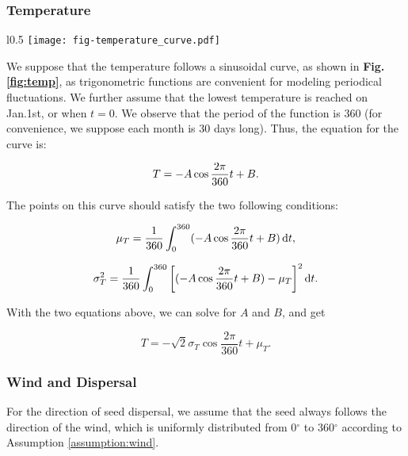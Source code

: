 \documentclass[12pt]{article}
\begin{document}
		\subsubsection{Temperature}
		
			\begin{wrapfigure}{l}{0.5\textwidth}
				\centering
				\texttt{[image: fig-temperature\_curve.pdf]}
				\caption{Temperature curve}
				\label{fig:temp}
			\end{wrapfigure}
			
			We suppose that the temperature follows a sinusoidal curve, as shown in \textbf{Fig.\ref{fig:temp}}, as trigonometric functions are convenient for modeling periodical fluctuations.  We further assume that the lowest temperature is reached on Jan.1st, or when $t = 0$.  We observe that the period of the function is 360 (for convenience, we suppose each month is 30 days long).  Thus, the equation for the curve is:
			
			\begin{equation}
				T = -A \cos{\frac{2\pi}{360} t} + B. \notag
			\end{equation}
			
			The points on this curve should satisfy the two following conditions:
			
			\begin{equation}
				\mu_T = \frac1{360} \int_0^{360} (-A \cos{\frac{2\pi}{360} t} + B) \, \mathrm{d}t, \notag
			\end{equation}
			
			\begin{equation}
				\sigma_T^2 = \frac1{360} \int_0^{360} \left[ (-A \cos{\frac{2\pi}{360} t} + B) - \mu_T \right] ^2 	\mathrm{d}t. \notag
			\end{equation}
			
			With the two equations above, we can solve for $A$ and $B$, and get
			
			\begin{equation}
				T = -\sqrt2 \sigma_T \cos{\frac{2\pi}{360} t} + \mu_T.
			\end{equation}
	
		\subsubsection{Wind and Dispersal}
		\label{subsubsec:wind}
			
			For the direction of seed dispersal, we assume that the seed always follows the direction of the wind, which is uniformly distributed from 0$^\circ$ to 360$^\circ$ according to Assumption \ref{assumption:wind}.  
			
\end{document}
